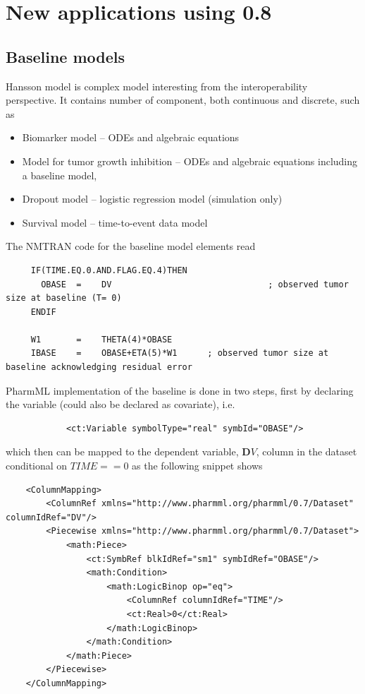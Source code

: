 
\chapter{New applications using 0.8}
\label{ch:074applications}

\section{Baseline models}
\label{sec:baselineMapping}

Hansson model \cite{Hansson:2013yq} is complex model
interesting from the interoperability perspective. It contains number of
component, both continuous and discrete, such as 
\begin{itemize}
\item 
Biomarker model -- ODEs and algebraic equations 
\item
Model for tumor growth inhibition -- ODEs and algebraic equations 
including a baseline model, \cite{dansirikul2008approaches}
\item
Dropout model -- logistic regression model (simulation only)
\item
Survival model -- time-to-event data model 
\end{itemize}
\bigskip
The NMTRAN code for the baseline model elements read
\lstset{language=NM}
\begin{lstlisting}
	 IF(TIME.EQ.0.AND.FLAG.EQ.4)THEN
	   OBASE  =    DV                        		; observed tumor size at baseline (T= 0)
	 ENDIF

	 W1       =    THETA(4)*OBASE
	 IBASE    =    OBASE+ETA(5)*W1		; observed tumor size at baseline acknowledging residual error
\end{lstlisting}
PharmML implementation of the baseline is done in two steps, first
by declaring the variable (could also be declared as covariate), i.e.
\lstset{language=XML}
\begin{lstlisting}
            <ct:Variable symbolType="real" symbId="OBASE"/>
\end{lstlisting}
which then can be mapped to the dependent variable, $\boldsymbol DV$, column in the
dataset conditional on \(TIME==0\) as the following snippet shows
\lstset{language=XML}
\begin{lstlisting}
    <ColumnMapping>
        <ColumnRef xmlns="http://www.pharmml.org/pharmml/0.7/Dataset" columnIdRef="DV"/>
        <Piecewise xmlns="http://www.pharmml.org/pharmml/0.7/Dataset">
            <math:Piece>
                <ct:SymbRef blkIdRef="sm1" symbIdRef="OBASE"/>
                <math:Condition>
                    <math:LogicBinop op="eq">
                        <ColumnRef columnIdRef="TIME"/>
                        <ct:Real>0</ct:Real>
                    </math:LogicBinop>
                </math:Condition>
            </math:Piece>
        </Piecewise>
    </ColumnMapping>
\end{lstlisting}
